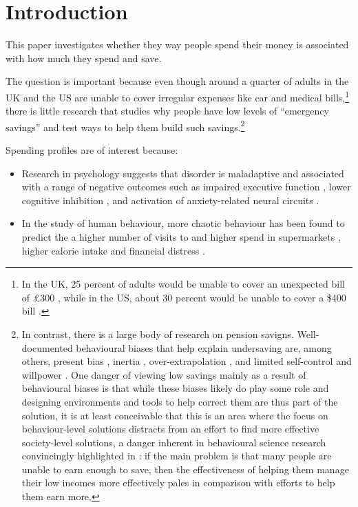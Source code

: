 
\section{Introduction}%
\label{sec:introduction}

This paper investigates whether they way people spend their money is associated
with how much they spend and save.

The question is important because even though around a quarter of adults in the
UK and the US are unable to cover irregular expenses like car and medical
bills,\footnote{In the UK, 25 percent of adults would be unable to cover an
    unexpected bill of \pounds300 \citep{philipps2021supporting}, while in the
US, about 30 percent would be unable to cover a \$400 bill
\citep{fed2022economic}.} there is little research that studies why people have
low levels of ``emergency savings'' and test ways to help them build such
savings.\footnote{In contrast, there is a large body of research on pension
    savigns.  Well-documented behavioural biases that help explain undersaving
    are, among others, present bias \citep{laibson1997golden,
    laibson2019intertemporal}, inertia \citep{madrian2001power},
    over-extrapolation \citep{choi2009reinforcement}, and limited self-control
    and willpower \citep{thaler1981economic, benhabib2005modeling,
    fudenberg2006dual, loewenstein2004animal, gul2001temptation}. One danger of
    viewing low savings mainly as a result of behavioural biases is that while
    these biases likely do play some role and designing environments and tools
    to help correct them are thus part of the solution, it is at least
    conceivable that this is an area where the focus on behaviour-level
    solutions distracts from an effort to find more effective society-level
    solutions, a danger inherent in behavioural science research convincingly
    highlighted in \citet{chater2022frame}: if the main problem is that many
    people are unable to earn enough to save, then the effectiveness of helping
them manage their low incomes more effectively pales in comparison with efforts
to help them earn more.}

Spending profiles are of interest because:
\begin{itemize}
    \item Research in psychology suggests that disorder is maladaptive and associated with a
        range of negative outcomes such as impaired executive function
        \citep{vernon2016predictors}, lower cognitive inhibition
        \citep{mittal2015cognitive}, and activation of anxiety-related neural
        circuits \citep{hirsh2012psychological}.

    \item In the study of human behaviour, more chaotic behaviour has been
        found to predict the a higher number of visits to and higher spend in supermarkets
        \citep{guidotti2015behavioral}, higher calorie intake
        \citep{skatova2019those} and financial distress
        \citep{muggleton2020evidence}.
\end{itemize}


